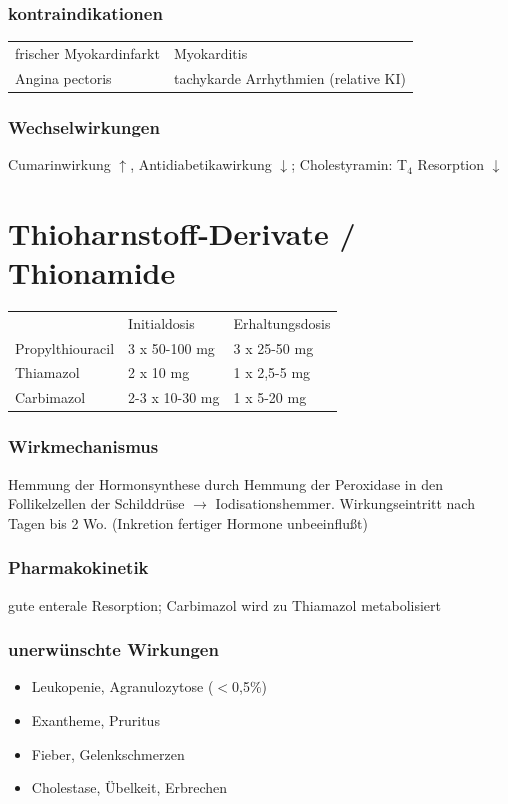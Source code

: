\documentclass[10pt,a4paper]{report}
\begin{document}
\subsubsection{kontraindikationen} %
\label{par:kontraindikationen}
\begin{tabularx}{\textwidth}{XX}
frischer Myokardinfarkt&Myokarditis\\ 
Angina pectoris&tachykarde Arrhythmien (relative KI)\\
\end{tabularx}
\subsubsection{Wechselwirkungen} %
\label{par:wechselwirkungen}
Cumarinwirkung $\uparrow$, Antidiabetikawirkung $\downarrow$; Cholestyramin: T$_4$ Resorption $\downarrow$
\section{Thioharnstoff-Derivate / Thionamide} %
\label{sec:thioharnstoff_derivate_thionamide}
\begin{tabularx}{\textwidth}{XXX}
&Initialdosis&Erhaltungsdosis\\	
Propylthiouracil&3 x 50-100 mg&3 x 25-50 mg\\
Thiamazol&2 x 10 mg&1 x 2,5-5 mg\\
Carbimazol&2-3 x 10-30 mg&1 x 5-20 mg\\
\end{tabularx}
\subsubsection{Wirkmechanismus} %
\label{par:wirkmechanismus}
Hemmung der Hormonsynthese durch Hemmung der Peroxidase in den Follikelzellen der Schilddrüse $\rightarrow$ Iodisationshemmer. Wirkungseintritt nach Tagen bis 2 Wo. (Inkretion fertiger Hormone unbeeinflußt)
\subsubsection{Pharmakokinetik} %
\label{par:pharmakokinetik}
gute enterale Resorption; Carbimazol wird zu Thiamazol metabolisiert
\subsubsection{unerwünschte Wirkungen} %
\label{par:paragraph_name}
\begin{itemize}
	\item Leukopenie, Agranulozytose ($<$0,5\%)
	\item Exantheme, Pruritus
	\item Fieber, Gelenkschmerzen 
	\item Cholestase, Übelkeit, Erbrechen
\end{itemize}
\end{document}
